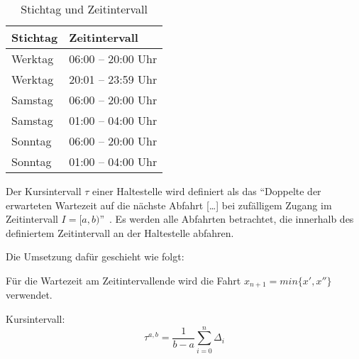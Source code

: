 \begin{table}[H]
    \centering
    \begin{tabular}[c]{l l}
        \toprule
        \textbf{Stichtag}
                                & \textbf{Zeitintervall}\\
        \midrule
        Werktag
                                & 06:00 -- 20:00 Uhr\\
        Werktag
                                & 20:01 -- 23:59 Uhr\\
        \midrule
        Samstag
                                & 06:00 -- 20:00 Uhr\\
        Samstag
                                & 01:00 -- 04:00 Uhr\\
        \midrule
        Sonntag
                                & 06:00 -- 20:00 Uhr\\
        Sonntag
                                & 01:00 -- 04:00 Uhr\\
        \bottomrule
    \end{tabular}
    \caption{Stichtag und Zeitintervall}
    \label{table:Stichtag und Zeitintervall}
\end{table}

Der Kursintervall $\tau$ einer Haltestelle wird definiert als das "`Doppelte der erwarteten Wartezeit auf die nächste Abfahrt [\ldots] bei zufälligem Zugang im Zeitintervall $I = [a,b)$"'~\cite{visum_manual_formula}.
Es werden alle Abfahrten betrachtet, die innerhalb des definiertem Zeitintervall an der Haltestelle abfahren.

Die Umsetzung dafür geschieht wie folgt:


Für die Wartezeit am Zeitintervallende wird die Fahrt $x_{n+1} = min\{x', x''\}$ verwendet.

Kursintervall:
\[
    \tau^{a, b} = \frac{1}{b - a} \sum_{i=0}^n \Delta_i
\]


